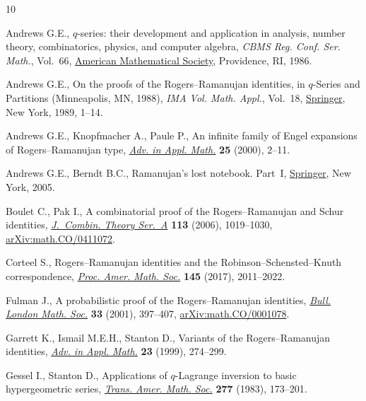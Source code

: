 \documentclass[pdftex]{sigma}
\numberwithin{equation}{section}
\begin{document}
%
%


\begin{thebibliography}{10}
\footnotesize\itemsep=0pt

Andrews G.E., {$q$}-series: their development and application in analysis,
 number theory, combinatorics, physics, and computer algebra, \textit{CBMS
 Reg. Conf. Ser. Math.}, Vol.~66, \href{https://doi.org/10.1090/cbms/066}{American Mathematical Society}, Providence,
 RI, 1986.

Andrews G.E., On the proofs of the {R}ogers--{R}amanujan identities, in
 {$q$}-{S}eries and {P}artitions ({M}inneapolis, {MN}, 1988), \textit{IMA Vol.
 Math. Appl.}, Vol.~18, \href{https://doi.org/10.1007/978-1-4684-0637-5_1}{Springer}, New York, 1989, 1--14.

Andrews G.E., Knopfmacher A., Paule P., An infinite family of {E}ngel
 expansions of {R}ogers--{R}amanujan type, \href{https://doi.org/10.1006/aama.2000.0686}{\textit{Adv. in Appl. Math.}}
 \textbf{25} (2000), 2--11.

Andrews G.E., Berndt B.C., Ramanujan's lost notebook. {P}art~{I}, \href{https://doi.org/10.1007/0-387-28124-X}{Springer}, New
 York, 2005.



Boulet C., Pak I., A combinatorial proof of the {R}ogers--{R}amanujan and
 {S}chur identities, \href{https://doi.org/10.1016/j.jcta.2005.09.007}{\textit{J.~Combin. Theory Ser.~A}} \textbf{113} (2006),
 1019--1030, \href{https://arxiv.org/abs/math.CO/0411072}{arXiv:math.CO/0411072}.

Corteel S., Rogers--{R}amanujan identities and the
 {R}obinson--{S}chensted--{K}nuth correspondence, \href{https://doi.org/10.1090/proc/13373}{\textit{Proc. Amer. Math.
 Soc.}} \textbf{145} (2017), 2011--2022.

Fulman J., A probabilistic proof of the {R}ogers--{R}amanujan identities,
 \href{https://doi.org/10.1017/S0024609301008207}{\textit{Bull. London Math. Soc.}} \textbf{33} (2001), 397--407,
 \href{https://arxiv.org/abs/math.CO/0001078}{arXiv:math.CO/0001078}.

Garrett K., Ismail M.E.H., Stanton D., Variants of the {R}ogers--{R}amanujan
 identities, \href{https://doi.org/10.1006/aama.1999.0658}{\textit{Adv. in Appl. Math.}} \textbf{23} (1999), 274--299.

Gessel I., Stanton D., Applications of {$q$}-{L}agrange inversion to basic
 hypergeometric series, \href{https://doi.org/10.2307/1999351}{\textit{Trans. Amer. Math. Soc.}} \textbf{277} (1983),
 173--201.


\end{thebibliography}
\end{document}
